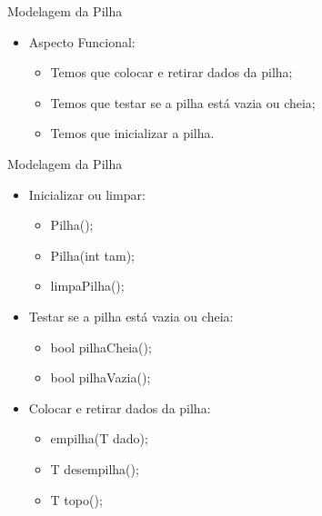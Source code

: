 \documentclass[12pt,table,xcolor={dvipsnames}]{beamer}
\begin{document}
\begin{frame}[fragile]{Modelagem da Pilha}

\begin{itemize}
\item Aspecto Funcional:
\begin{itemize}
\item Temos que colocar e retirar dados da pilha;
\item Temos que testar se a pilha está vazia ou cheia;
\item Temos que inicializar a pilha.
\end{itemize}
\end{itemize}
\end{frame}

\begin{frame}[fragile]{Modelagem da Pilha}

\begin{itemize}
\item Inicializar ou limpar:
\begin{itemize}
\item Pilha();
\item Pilha(int tam);
\item limpaPilha();
\end{itemize}
\item Testar se a pilha está vazia ou cheia:
\begin{itemize}
\item bool pilhaCheia();
\item bool pilhaVazia();
\end{itemize}
\item Colocar e retirar dados da pilha:
\begin{itemize}
\item empilha(T dado);
\item T desempilha();
\item T topo();
\end{itemize}
\end{itemize}
\end{frame}
\end{document}
